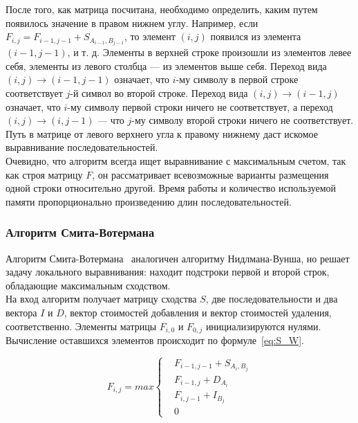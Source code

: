 \indent  После того, как матрица посчитана, необходимо определить, каким путем появилось значение в правом нижнем углу. Например, если $F_{i,j} = F_{i-1,j-1} +S_{A_{i-1},B_{j-1}}$, то элемент $(i, j)$ появился из элемента $(i - 1, j - 1)$, и т. д. Элементы в верхней строке произошли из элементов левее себя, элементы из левого столбца --- из элементов выше себя. Переход вида $(i, j) \rightarrow (i - 1, j - 1)$ означает, что $i$-му символу в первой строке соответствует $j$-й символ во второй строке. Переход вида $(i, j) \rightarrow (i - 1, j)$ означает, что $i$-му символу первой строки ничего не соответствует, а переход $(i, j) \rightarrow (i, j - 1)$ --- что $j$-му символу второй строки ничего не соответствует. Путь в матрице от левого верхнего угла к правому нижнему даст искомое выравнивание последовательностей.\\
\indent Очевидно, что алгоритм всегда ищет выравнивание с максимальным счетом, так как строя матрицу $F$, он рассматривает всевозможные варианты размещения одной строки относительно другой. Время работы и количество используемой памяти пропорционально произведению длин последовательностей.

\subsubsection[Алгоритм Смита-Вотермана]{\large Алгоритм Смита-Вотермана}
\hspace{\parindent} Алгоритм Смита-Вотермана~\cite{SWalgo} аналогичен алгоритму Нидлмана-Вунша, но решает задачу локального выравнивания: находит подстроки первой и второй строк, обладающие максимальным сходством.\\
\indent На вход алгоритм получает матрицу сходства $S$, две последовательности и два вектора $I$ и $D$, вектор стоимостей добавления и вектор стоимостей удаления, соответственно. Элементы матрицы $F_{i,0}$ и $F_{0,j}$ инициализируются нулями.  Вычисление оставшихся элементов происходит по формуле~\ref{eq:S_W}.

\begin{equation}\label{eq:S_W}
F_{i,j} = max\left\{
	\begin{aligned}
		& F_{i-1,j-1} + S_{A_i,B_j}\\
		& F_{i-1,j} + D_{A_i}\\
		& F_{i,j-1} + I_{B_j}\\
		& 0
	\end{aligned}
	\right.
\end{equation}

